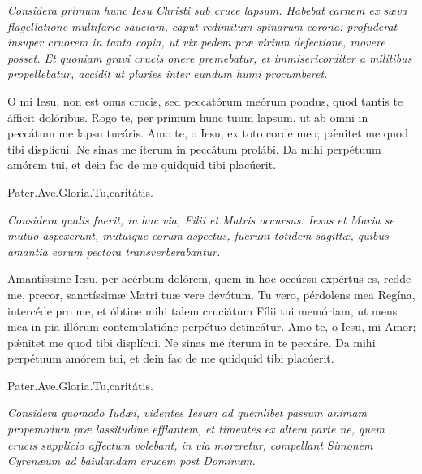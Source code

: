 \documentclass[12pt,a6paper]{book}
\newcommand{\V}{\textbf{V.} }
\newcommand{\R}{\textbf{R.} }
\newcommand{\officiumtitle}[1]{\subsection*{\parbox{\linewidth}{\centering\textbf{\textit{#1}}}}}
\newcommand{\centeredtext}[1]{\parbox{\linewidth}{\centering\textit{#1}}}
\begin{document}
\begin{sloppy}
\textit{Considera primum hunc Iesu Christi sub cruce lapsum. Habebat carnem ex sæva flagellatione multifarie sauciam, caput redimitum spinarum corona: profuderat insuper cruorem in tanta copia, ut vix pedem præ virium defectione, movere posset. Et quoniam gravi crucis onere premebatur, et immisericorditer a militibus propellebatur, accidit ut pluries inter eundum humi procumberet.}

O mi Iesu, non est onus crucis, sed peccatórum meórum pondus, quod tantis te áfficit dolóribus. Rogo te, per primum hunc tuum lapsum, ut ab omni in peccátum me lapsu tueáris. Amo te, o Iesu, ex toto corde meo; pǽnitet me quod tibi displícui. Ne sinas me íterum in peccátum prolábi. Da mihi perpétuum amórem tui, et dein fac de me quidquid tibi placúerit.

Pater.Ave.Gloria.Tu,caritátis.


\textit{Considera qualis fuerit, in hac via, Filii et Matris occursus. Iesus et Maria se mutuo aspexerunt, mutuique eorum aspectus, fuerunt totidem sagittæ, quibus amantia eorum pectora transverberabantur.}

Amantíssime Iesu, per acérbum dolórem, quem in hoc occúrsu expértus es, redde me, precor, sanctíssimæ Matri tuæ vere devótum. Tu vero, pérdolens mea Regína, intercéde pro me, et óbtine mihi talem cruciátum Fílii tui memóriam, ut mens mea in pia illórum contemplatióne perpétuo detineátur. Amo te, o Iesu, mi Amor; pǽnitet me quod tibi displícui. Ne sinas me íterum in te peccáre. Da mihi perpétuum amórem tui, et dein fac de me quidquid tibi placúerit.

Pater.Ave.Gloria.Tu,caritátis.


\textit{Considera quomodo Iudæi, videntes Iesum ad quemlibet passum animam propemodum præ lassitudine efflantem, et timentes ex altera parte ne, quem crucis supplicio affectum volebant, in via moreretur, compellant Simonem Cyrenæum ad baiulandam crucem post Dominum.}


\end{sloppy}
\end{document}
